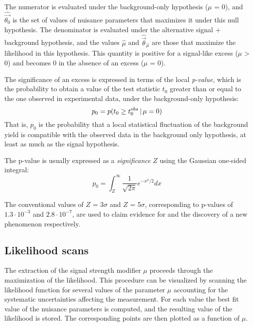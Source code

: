 The numerator is evaluated under the background-only hypothesis ($\mu$ = 0), and $\widehat{\vec{\theta_0}}$ is the set of values of nuisance parameters that maximizes it under this null hypothesis.
The denominator is evaluated under the alternative signal + background hypothesis,
and the values $\hat{\mu}$ and $\widehat{\vec{\theta}}_{\hat\mu}$
are those that maximize the likelihood in this hypothesis.
This quantity is positive for a signal-like excess ($\mu$ > 0) and becomes 0 in the absence of an excess ($\mu$ = 0).

The significance of an excess is expressed in terms of the local \textit{p-value}, which is the probability to obtain a value of the test statistic $t_0$ greater than or equal to the one observed in experimental data, under the background-only hypothesis:
\begin{equation}
  \label{eq:pvalue}
  p_0 = p(t_0 \ge t_0^{obs}\, |\, \mu = 0)
\end{equation}
That is, $p_0$ is the probability that a local statistical fluctuation of the background yield
is compatible with the observed data in the background only hypothesis,
at least as much as the signal hypothesis.

The p-value is usually expressed as a \textit{significance} $Z$ using the Gaussian one-sided integral:
\begin{equation}
  \label{eq:significance}
  p_0 = \int_Z^\infty \frac{1}{\sqrt{2\pi}}e^{-x^2/2}dx
\end{equation}

The conventional values of $Z$ = 3$\sigma$ and $Z$ = 5$\sigma$, corresponding to p-values of $1.3 \cdot 10^{-3}$ and $2.8 \cdot 10^{-7}$, are used to claim evidence for and the discovery of a new phenomenon respectively.


\subsection{Likelihood scans}
\label{sec:likelihood_scans}
The extraction of the signal strength modifier $\mu$ proceeds through the maximization of the likelihood.
This procedure can be visualized by scanning the likelihood function for several values of the parameter $\mu$
accounting for the systematic uncertainties affecting the measurement.
For each value the best fit value of the nuisance parameters is computed,
and the resulting value of the likelihood is stored.
The corresponding points are then plotted as a function of $\mu$.

